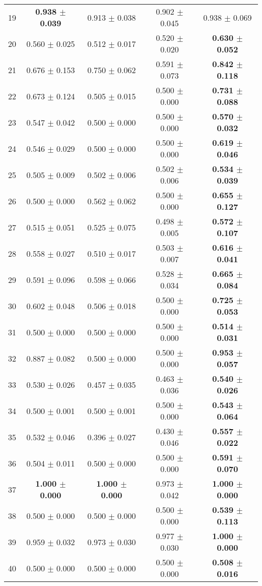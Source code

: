 \begin{table}[!ht]
{\begin{tabular}{r c c c c}
19 & \textbf{0.938 $\pm$ 0.039} & 0.913 $\pm$ 0.038 & 0.902 $\pm$ 0.045 & 0.938 $\pm$ 0.069 \\
20 & 0.560 $\pm$ 0.025 & 0.512 $\pm$ 0.017 & 0.520 $\pm$ 0.020 & \textbf{0.630 $\pm$ 0.052} \\
21 & 0.676 $\pm$ 0.153 & 0.750 $\pm$ 0.062 & 0.591 $\pm$ 0.073 & \textbf{0.842 $\pm$ 0.118} \\
22 & 0.673 $\pm$ 0.124 & 0.505 $\pm$ 0.015 & 0.500 $\pm$ 0.000 & \textbf{0.731 $\pm$ 0.088} \\
23 & 0.547 $\pm$ 0.042 & 0.500 $\pm$ 0.000 & 0.500 $\pm$ 0.000 & \textbf{0.570 $\pm$ 0.032} \\
24 & 0.546 $\pm$ 0.029 & 0.500 $\pm$ 0.000 & 0.500 $\pm$ 0.000 & \textbf{0.619 $\pm$ 0.046} \\
25 & 0.505 $\pm$ 0.009 & 0.502 $\pm$ 0.006 & 0.502 $\pm$ 0.006 & \textbf{0.534 $\pm$ 0.039} \\
26 & 0.500 $\pm$ 0.000 & 0.562 $\pm$ 0.062 & 0.500 $\pm$ 0.000 & \textbf{0.655 $\pm$ 0.127} \\
27 & 0.515 $\pm$ 0.051 & 0.525 $\pm$ 0.075 & 0.498 $\pm$ 0.005 & \textbf{0.572 $\pm$ 0.107} \\
28 & 0.558 $\pm$ 0.027 & 0.510 $\pm$ 0.017 & 0.503 $\pm$ 0.007 & \textbf{0.616 $\pm$ 0.041} \\
29 & 0.591 $\pm$ 0.096 & 0.598 $\pm$ 0.066 & 0.528 $\pm$ 0.034 & \textbf{0.665 $\pm$ 0.084} \\
30 & 0.602 $\pm$ 0.048 & 0.506 $\pm$ 0.018 & 0.500 $\pm$ 0.000 & \textbf{0.725 $\pm$ 0.053} \\
31 & 0.500 $\pm$ 0.000 & 0.500 $\pm$ 0.000 & 0.500 $\pm$ 0.000 & \textbf{0.514 $\pm$ 0.031} \\
32 & 0.887 $\pm$ 0.082 & 0.500 $\pm$ 0.000 & 0.500 $\pm$ 0.000 & \textbf{0.953 $\pm$ 0.057} \\
33 & 0.530 $\pm$ 0.026 & 0.457 $\pm$ 0.035 & 0.463 $\pm$ 0.036 & \textbf{0.540 $\pm$ 0.026} \\
34 & 0.500 $\pm$ 0.001 & 0.500 $\pm$ 0.001 & 0.500 $\pm$ 0.000 & \textbf{0.543 $\pm$ 0.064} \\
35 & 0.532 $\pm$ 0.046 & 0.396 $\pm$ 0.027 & 0.430 $\pm$ 0.046 & \textbf{0.557 $\pm$ 0.022} \\
36 & 0.504 $\pm$ 0.011 & 0.500 $\pm$ 0.000 & 0.500 $\pm$ 0.000 & \textbf{0.591 $\pm$ 0.070} \\
37 & \textbf{1.000 $\pm$ 0.000} & \textbf{1.000 $\pm$ 0.000} & 0.973 $\pm$ 0.042 & \textbf{1.000 $\pm$ 0.000} \\
38 & 0.500 $\pm$ 0.000 & 0.500 $\pm$ 0.000 & 0.500 $\pm$ 0.000 & \textbf{0.539 $\pm$ 0.113} \\
39 & 0.959 $\pm$ 0.032 & 0.973 $\pm$ 0.030 & 0.977 $\pm$ 0.030 & \textbf{1.000 $\pm$ 0.000} \\
40 & 0.500 $\pm$ 0.000 & 0.500 $\pm$ 0.000 & 0.500 $\pm$ 0.000 & \textbf{0.508 $\pm$ 0.016} \\
\end{tabular}}
\end{table}
